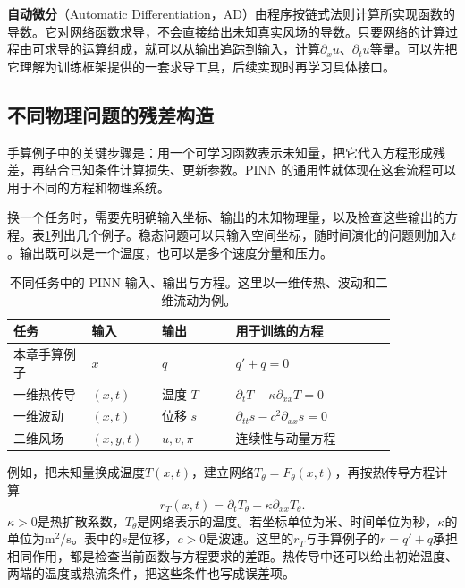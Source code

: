 \textbf{自动微分}（Automatic Differentiation，AD）由程序按链式法则计算所实现函数的导数。它对网络函数求导，不会直接给出未知真实风场的导数。只要网络的计算过程由可求导的运算组成，就可以从输出追踪到输入，计算$\partial_xu$、$\partial_tu$等量。可以先把它理解为训练框架提供的一套求导工具，后续实现时再学习具体接口。

\subsection{不同物理问题的残差构造}
\label{sec:pinn-generality}
手算例子中的关键步骤是：用一个可学习函数表示未知量，把它代入方程形成残差，再结合已知条件计算损失、更新参数。PINN 的通用性就体现在这套流程可以用于不同的方程和物理系统\cite{raissi2019pinn,wang2023expert}。

换一个任务时，需要先明确输入坐标、输出的未知物理量，以及检查这些输出的方程。表\ref{tab:pinn-general-problems}列出几个例子。稳态问题可以只输入空间坐标，随时间演化的问题则加入$t$。输出既可以是一个温度，也可以是多个速度分量和压力。

\begin{table}[htbp]
\centering\small
\caption{不同任务中的 PINN 输入、输出与方程。这里以一维传热、波动和二维流动为例。}
\label{tab:pinn-general-problems}
\begin{tabular}{m{0.18\linewidth}m{0.13\linewidth}m{0.17\linewidth}m{0.37\linewidth}}
\toprule
任务 & 输入 & 输出 & 用于训练的方程\\
\midrule
本章手算例子 & $x$ & $q$ & $q'+q=0$\\
一维热传导 & $(x,t)$ & 温度 $T$ & $\partial_tT-\kappa\partial_{xx}T=0$\\
一维波动 & $(x,t)$ & 位移 $s$ & $\partial_{tt}s-c^2\partial_{xx}s=0$\\
二维风场 & $(x,y,t)$ & $u,v,\pi$ & 连续性与动量方程\\
\bottomrule
\end{tabular}
\end{table}

例如，把未知量换成温度$T(x,t)$，建立网络$T_\theta=F_\theta(x,t)$，再按热传导方程计算
\begin{equation}
 r_T(x,t)=\partial_tT_\theta-\kappa\partial_{xx}T_\theta.
 \label{eq:pinn-generic-heat-residual}
\end{equation}
$\kappa>0$是热扩散系数，$T_\theta$是网络表示的温度。若坐标单位为米、时间单位为秒，$\kappa$的单位为$\mathrm{m^2/s}$。表中的$s$是位移，$c>0$是波速。这里的$r_T$与手算例子的$r=q'+q$承担相同作用，都是检查当前函数与方程要求的差距。热传导中还可以给出初始温度、两端的温度或热流条件，把这些条件也写成误差项。

